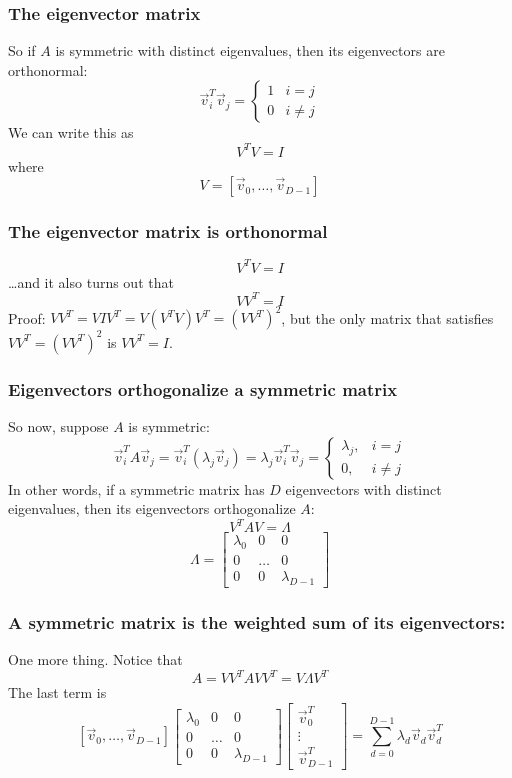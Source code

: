 \documentclass{beamer}
\begin{document}
\begin{frame}
  \frametitle{The eigenvector matrix}
  So if $A$ is symmetric with distinct eigenvalues, then
  its eigenvectors  are orthonormal:
  \[
  \vec{v}_i^T\vec{v}_j=
  \begin{cases}
    1&i=j\\
    0&i\ne j
  \end{cases}
  \]
  We can  write this as
  \[
  V^TV = I
  \]
  where
  \[
  V=\left[\vec{v}_0,\ldots,\vec{v}_{D-1}\right]
  \]
\end{frame}

\begin{frame}
  \frametitle{The eigenvector matrix is orthonormal}
  \[
  V^TV = I
  \]
  \ldots and it also turns out that
  \[
  VV^T = I
  \]
  Proof: 
  $VV^T=VIV^T=V(V^TV)V^T=(VV^T)^2$, but the only matrix that satisfies
  $VV^T=(VV^T)^2$ is $VV^T=I$.
\end{frame}

\begin{frame}
  \frametitle{Eigenvectors orthogonalize a symmetric matrix}
  So now, suppose $A$ is symmetric:
  \[
  \vec{v}_i^TA\vec{v}_j=
  \vec{v}_i^T(\lambda_j\vec{v}_j)=\lambda_j\vec{v}_i^T\vec{v}_j
  =\begin{cases}\lambda_j,&i=j\\0,&i\ne j\end{cases}
  \]
  In other words, if a symmetric matrix has $D$ eigenvectors with
  distinct eigenvalues, then its eigenvectors orthogonalize $A$:
  \[
  V^TAV = \Lambda
  \]
  \[
  \Lambda=
  \left[\begin{array}{ccc}\lambda_0&0&0\\0&\ldots&0\\0&0&\lambda_{D-1}\end{array}\right]
  \]
\end{frame}

\begin{frame}
  \frametitle{A symmetric matrix is the weighted sum of its eigenvectors:}
  One more thing.  Notice that
  \[
  A = VV^TAVV^T =V\Lambda V^T
  \]
  The last term is
  \[
  \left[\vec{v}_0,\ldots,\vec{v}_{D-1}\right]
  \left[\begin{array}{ccc}\lambda_0&0&0\\0&\ldots&0\\0&0&\lambda_{D-1}\end{array}\right]  
  \left[\begin{array}{c}\vec{v}_0^T\\\vdots\\\vec{v}_{D-1}^T\end{array}\right]=
  \sum_{d=0}^{D-1}\lambda_d \vec{v}_d\vec{v}_d^T
  \]
\end{frame}
\end{document}
